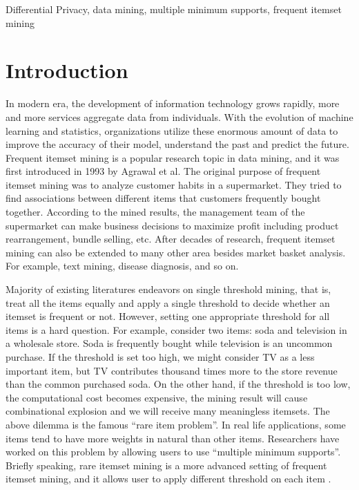 \documentclass[conference]{IEEEtran}
\begin{document}
\begin{IEEEkeywords}
Differential Privacy, data mining, multiple minimum supports, frequent itemset mining
\end{IEEEkeywords}

\section{Introduction}%
In modern era, the development of information technology grows rapidly, more and more services aggregate data from individuals. 
With the evolution of machine learning and statistics, organizations utilize these enormous amount of data to improve the accuracy of their model, understand the past and predict the future.
Frequent itemset mining is a popular research topic in data mining, and it was first introduced in 1993 by Agrawal et al.\cite{b1} 
The original purpose of frequent itemset mining was to analyze customer habits in a supermarket. 
They tried to find associations between different items that customers frequently bought together. 
According to the mined results, the management team of the supermarket can make business decisions to maximize profit including product rearrangement, bundle selling, etc.
After decades of research, frequent itemset mining can also be extended to many other area besides market basket analysis. For example, text mining, disease diagnosis, and so on.

Majority of existing literatures endeavors on single threshold mining, that is, treat all the items equally and apply a single threshold to decide whether an itemset is frequent or not.
However, setting one appropriate threshold for all items is a hard question. 
For example, consider two items: soda and television in a wholesale store. Soda is frequently bought while television is an uncommon purchase. 
If the threshold is set too high, we might consider TV as a less important item, but TV contributes thousand times more to the store revenue than the common purchased soda. 
On the other hand, if the threshold is too low, the computational cost becomes expensive, the mining result will cause combinational explosion and we will receive many meaningless itemsets. 
The above dilemma is the famous ``rare item problem''. In real life applications, some items tend to have more weights in natural than other items. 
Researchers \cite{b2}\cite{b3}\cite{b4}\cite{b5} have worked on this problem by allowing users to use ``multiple minimum supports''. 
Briefly speaking, rare itemset mining is a more advanced setting of frequent itemset mining, and it allows user to apply different threshold on each item .
\end{document}
